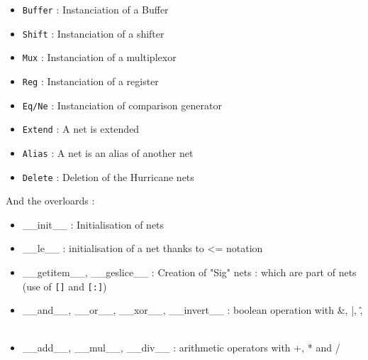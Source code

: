 \begin{itemize}
    \item \verb-Buffer- : Instanciation of a Buffer
    \item \verb-Shift- : Instanciation of a shifter
    \item \verb-Mux- : Instanciation of a multiplexor
    \item \verb-Reg- : Instanciation of a register
    \item \verb-Eq/Ne- : Instanciation of comparison generator
    \item \verb-Extend- : A net is extended
    \item \verb-Alias- : A net is an alias of another net
    \item \verb-Delete- : Deletion of the Hurricane nets\\
\end{itemize}
\indent And the overloards :
\begin{itemize}
    \item \_\_init\_\_ : Initialisation of nets
    \item \_\_le\_\_ : initialisation of a net thanks to <= notation
    \item \_\_getitem\_\_, \_\_geslice\_\_ : Creation of "Sig" nets : which are part of nets (use of \verb-[]- and \verb-[:]-)
    \item \_\_and\_\_, \_\_or\_\_, \_\_xor\_\_, \_\_invert\_\_ : boolean operation with \&, |, \^ , ~
    \item \_\_add\_\_, \_\_mul\_\_, \_\_div\_\_ : arithmetic operators with +, * and /
\end{itemize}
